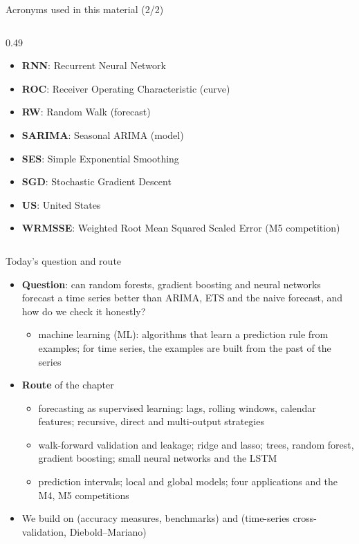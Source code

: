 \begin{frame}{Acronyms used in this material (2/2)}
\begin{columns}[T]
\begin{column}{0.49\textwidth}
\begin{itemize}
    \item \textbf{RNN}: Recurrent Neural Network
    \item \textbf{ROC}: Receiver Operating Characteristic (curve)
    \item \textbf{RW}: Random Walk (forecast)
    \item \textbf{SARIMA}: Seasonal ARIMA (model)
    \item \textbf{SES}: Simple Exponential Smoothing
    \item \textbf{SGD}: Stochastic Gradient Descent
    \item \textbf{US}: United States
    \item \textbf{WRMSSE}: Weighted Root Mean Squared Scaled Error (M5 competition)
\end{itemize}
\end{column}
\end{columns}
\end{frame}

\begin{frame}{Today's question and route}
\itemsize{\small}
\begin{itemize}
    \item \textbf{Question}: can random forests, gradient boosting and neural networks forecast a time series better than ARIMA, ETS and the naive forecast, and how do we check it honestly?
    \begin{itemize}
        \item machine learning (ML): algorithms that learn a prediction rule from examples; for time series, the examples are built from the past of the series
    \end{itemize}
    \item \textbf{Route} of the chapter
    \begin{itemize}
        \item forecasting as supervised learning: lags, rolling windows, calendar features; recursive, direct and multi-output strategies
        \item walk-forward validation and leakage; ridge and lasso; trees, random forest, gradient boosting; small neural networks and the LSTM
        \item prediction intervals; local and global models; four applications and the M4, M5 competitions
    \end{itemize}
    \item We build on  (accuracy measures, benchmarks) and  (time-series cross-validation, Diebold--Mariano)
\end{itemize}
\end{frame}

